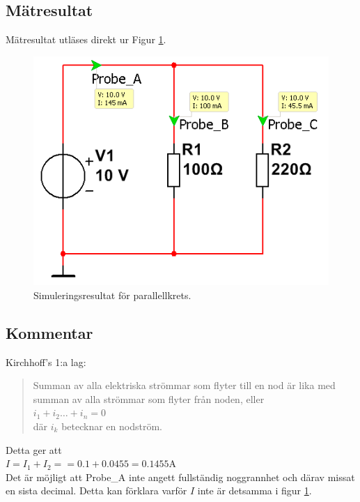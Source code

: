 \documentclass[11pt,a4paper]{article}
\begin{document}
\subsection{Mätresultat}\label{}
Mätresultat utläses direkt ur Figur \ref{fig:sim3}.

\begin{figure}[htbp]
    \centering
    \includegraphics[scale=0.5]{ee466multisim/3.png}
    \caption{Simuleringsresultat för parallellkrets.}
    \label{fig:sim3}
\end{figure}

\subsection{Kommentar}\label{}
Kirchhoff's 1:a lag:
\begin{quote}
Summan av alla elektriska strömmar som flyter till en nod är lika med summan av alla strömmar som flyter från noden, eller\\
$i_1 + i_2 \ldots + i_n = 0$\\
där $i_k$ betecknar en nodström.
\end{quote}
Detta ger att \\
$I = I_1 + I_2 =
= 0.1 + 0.0455 = 0.1455 \si{\ampere}$\\
Det är möjligt att Probe\_A inte angett fullständig noggrannhet och därav missat en sista decimal. Detta kan förklara varför $I$ inte är detsamma i figur \ref{fig:sim3}.
\clearpage
\end{document}

